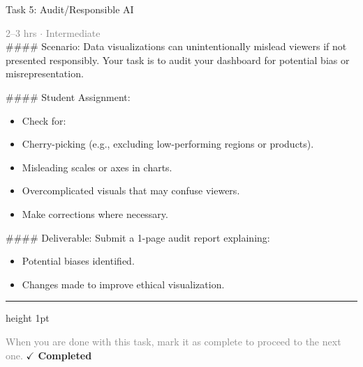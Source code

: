 \documentclass[10pt,a4paper]{article}
\begin{document}
\begin{taskbox}{Task 5: Audit/Responsible AI}

    {\small \textcolor{gray}{2--3 hrs $\cdot$ Intermediate}}\\[12pt]

    \#\#\#\# Scenario:
Data visualizations can unintentionally mislead viewers if not presented responsibly. Your task is to audit your dashboard for potential bias or misrepresentation.

\#\#\#\# Student Assignment:
\begin{itemize}
    \item Check for:
    \item Cherry-picking (e.g., excluding low-performing regions or products).
    \item Misleading scales or axes in charts.
    \item Overcomplicated visuals that may confuse viewers.
    \item Make corrections where necessary.
\end{itemize}

\#\#\#\# Deliverable:
Submit a 1-page audit report explaining:
\begin{itemize}
    \item Potential biases identified.
    \item Changes made to improve ethical visualization.\par
\end{itemize}

    \vspace{16pt}

    \textcolor{cardBorder}{\hrule height 1pt}\vspace{8pt}

    \small \textcolor{gray}{When you are done with this task, mark it as complete to proceed to the next one.} \hfill \textbf{\textcolor{brandDark}{$\checkmark$ Completed}}

\end{taskbox}
\end{document}
